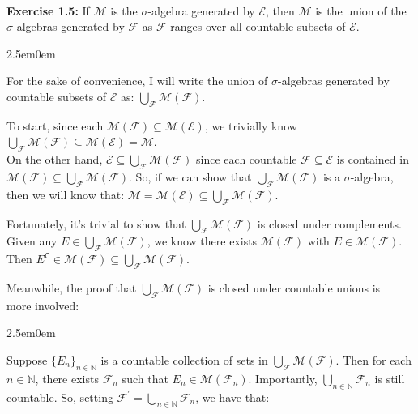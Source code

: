 \documentclass{book}
\newcommand{\exOne}{%
   \color{Purple}%
   \fontsize{13}{15}\selectfont%
}
\newcommand{\exTwoP}{%
   \color{RedViolet}%
   \fontsize{13}{15}\selectfont%
}
\newcommand{\exPPP}{%
   \color{VioletRed}%
   \fontsize{12}{14}\selectfont%
}
\newenvironment{myIndent}{%
   \begin{adjustwidth}{2.5em}{0em}%
}{%
   \end{adjustwidth}%
}
\newcommand{\blab}[1]{\textbf{#1}}
\newcommand{\comp}{\mathsf{C}}
\newcommand{\mySepTwo}[1][.]{%
   {\noindent\color{#1}{\rule{6.5in}{0.5mm}}}\\%
}
\newcommand{\retTwo}{\hfill\bigbreak}
\begin{document}
\exOne\mySepTwo 

\blab{Exercise 1.5:} If $\mathcal{M}$ is the $\sigma$-algebra generated by $\mathcal{E}$, then $\mathcal{M}$ is the union of the $\sigma$-algebras generated by $\mathcal{F}$ as $\mathcal{F}$ ranges over all countable subsets of $\mathcal{E}$.

\begin{myIndent}\exTwoP
   For the sake of convenience, I will write the union of $\sigma$-algebras generated by\\ countable subsets of $\mathcal{E}$ as: $\bigcup_\mathcal{F} \mathcal{M}(\mathcal{F})$.\retTwo

   To start, since each $\mathcal{M}(\mathcal{F}) \subseteq \mathcal{M}(\mathcal{E})$, we trivially know $\bigcup_\mathcal{F}\mathcal{M}(\mathcal{F}) \subseteq \mathcal{M}(\mathcal{E}) = \mathcal{M}$.\\ On the other hand, $\mathcal{E} \subseteq \bigcup_\mathcal{F}\mathcal{M}(\mathcal{F})$ since each countable $\mathcal{F} \subseteq \mathcal{E}$ is contained in\\ $\mathcal{M}(\mathcal{F}) \subseteq \bigcup_\mathcal{F}\mathcal{M}(\mathcal{F})$. So, if we can show that $\bigcup_\mathcal{F}\mathcal{M}(\mathcal{F})$ is a $\sigma$-algebra, then we will know that: $\mathcal{M} = \mathcal{M}(\mathcal{E}) \subseteq \bigcup_\mathcal{F}\mathcal{M}(\mathcal{F})$.\retTwo

   Fortunately, it's trivial to show that $\bigcup_\mathcal{F}\mathcal{M}(\mathcal{F})$ is closed under complements.\\ Given any $E \in \bigcup_\mathcal{F}\mathcal{M}(\mathcal{F})$, we know there exists $\mathcal{M}(\mathcal{F})$ with $E \in \mathcal{M}(\mathcal{F})$.\\ Then $E^\comp \in \mathcal{M}(\mathcal{F}) \subseteq \bigcup_\mathcal{F}\mathcal{M}(\mathcal{F})$. \retTwo
   
   Meanwhile, the proof that $\bigcup_\mathcal{F}\mathcal{M}(\mathcal{F})$ is closed under countable unions is\\ more involved:\\ [-9pt]
   \begin{myIndent}\exPPP
      Suppose $\{E_n\}_{n \in \mathbb{N}}$ is a countable collection of sets in $\bigcup_\mathcal{F}\mathcal{M}(\mathcal{F})$. Then for each\\ $n \in \mathbb{N}$, there exists $\mathcal{F}_n$ such that $E_n \in \mathcal{M}(\mathcal{F}_n)$. Importantly, $\bigcup\limits_{n \in \mathbb{N}}\mathcal{F}_n$ is still\\ [-7pt] countable. So, setting $\mathcal{F}^\prime = \bigcup\limits_{n \in \mathbb{N}}\mathcal{F}_n$, we have that:


\end{myIndent}
\end{myIndent}
\end{document}
